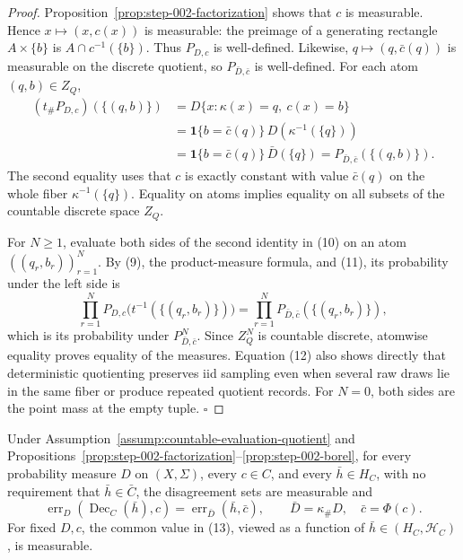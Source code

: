 \begin{proof}
Proposition~\ref{prop:step-002-factorization} shows that \(c\) is
measurable. Hence \(x\mapsto(x,c(x))\) is measurable: the preimage of a
generating rectangle \(A\times\{b\}\) is
\(A\cap c^{-1}(\{b\})\). Thus \(P_{D,c}\) is well-defined. Likewise,
\(q\mapsto(q,\bar c(q))\) is measurable on the discrete quotient, so
\(P_{\bar D,\bar c}\) is well-defined. For each atom
\((q,b)\in Z_Q\),
\[
\begin{aligned}
(t_\#P_{D,c})(\{(q,b)\})
&=D\{x:\kappa(x)=q,\ c(x)=b\}\\
&=\mathbf 1\{b=\bar c(q)\}\,D(\kappa^{-1}(\{q\}))\\
&=\mathbf 1\{b=\bar c(q)\}\,\bar D(\{q\})
=P_{\bar D,\bar c}(\{(q,b)\}).
\end{aligned}
\tag{11}
\]
The second equality uses that \(c\) is exactly constant with value
\(\bar c(q)\) on the whole fiber \(\kappa^{-1}(\{q\})\). Equality on atoms
implies equality on all subsets of the countable discrete space \(Z_Q\).

For \(N\ge1\), evaluate both sides of the second identity in (10) on an atom
\(((q_r,b_r))_{r=1}^N\). By (9), the product-measure formula, and (11), its
probability under the left side is
\[
\prod_{r=1}^N
P_{D,c}\bigl(t^{-1}(\{(q_r,b_r)\})\bigr)
=\prod_{r=1}^N P_{\bar D,\bar c}(\{(q_r,b_r)\}),
\tag{12}
\]
which is its probability under \(P_{\bar D,\bar c}^N\). Since \(Z_Q^N\) is
countable discrete, atomwise equality proves equality of the measures.
Equation (12) also shows directly that deterministic quotienting preserves
iid sampling even when several raw draws lie in the same fiber or produce
repeated quotient records. For \(N=0\), both sides are the point mass at the
empty tuple. \(\square\)


\end{proof}

\begin{proposition}\label{prop:step-002-risk}
Under Assumption~\ref{assump:countable-evaluation-quotient} and
Propositions~\ref{prop:step-002-factorization}--\ref{prop:step-002-borel},
for every probability measure \(D\) on \((X,\Sigma)\), every \(c\in C\),
and every \(\bar h\in H_C\), with no requirement that
\(\bar h\in\bar C\), the disagreement sets are measurable and
\[
\operatorname{err}_D(\operatorname{Dec}_C(\bar h),c)
=\operatorname{err}_{\bar D}(\bar h,\bar c),
\qquad \bar D=\kappa_\#D,\quad \bar c=\Phi(c).
\tag{13}
\]
For fixed \(D,c\), the common value in (13), viewed as a function of
\(\bar h\in(H_C,\mathcal H_C)\), is measurable.


\end{proposition}

